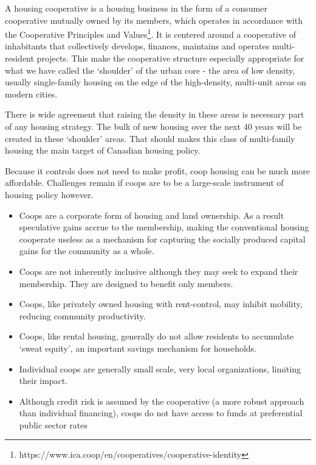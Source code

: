  A housing cooperative is a housing business in the form of a consumer cooperative mutually owned by its members, which operates in accordance with the Cooperative Principles and Values\footnote{https://www.ica.coop/en/cooperatives/cooperative-identity}. It is centered around a cooperative of inhabitants that collectively develops, finances, maintains and operates multi-resident projects. This make the cooperative structure  especially appropriate for what we have called the `shoulder' of the urban core - the area of low density, usually single-family housing on the edge of the high-density, multi-unit areas on modern cities. 
 
 There is wide agreement that raising the density in these areas is necessary part of any housing strategy. The bulk of new housing over the next 40 years will be created in these `shoulder' areas. That should makes this class of multi-family housing the main target of Canadian housing policy. 
 
 Because it controls  does not need to make profit, coop housing can be much more affordable. Challenges remain if coops are to be a large-scale instrument of housing policy however. 
 
 \begin{itemize}
     \item Coops are a corporate form of housing and land ownership. As a result speculative gains accrue to the membership, making the conventional housing cooperate useless as a mechanism for capturing the socially produced capital gains for the community as a whole.
     \item Coops are not inherently inclusive although they may seek to expand their membership. They are designed to benefit only members. 

     \item Coops, like privately owned housing with rent-control, may inhibit mobility, reducing community productivity.
     \item Coops, like rental housing, generally do not allow residents to accumulate    `sweat equity', an important savings mechanism for  households.
     \item Individual coops are generally small scale, very local organizations, limiting their impact.
     \item Although credit risk is assumed by the cooperative  (a more robust approach than individual financing), coops do not have access to funds at preferential public sector rates
 \end{itemize}

